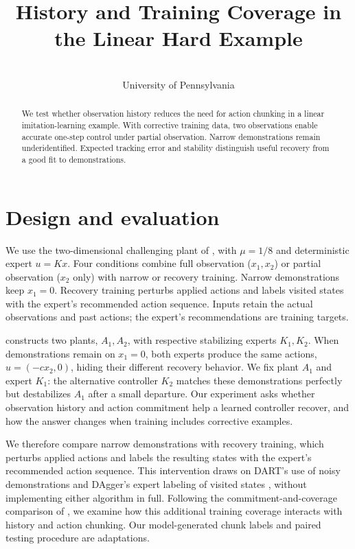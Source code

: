 \documentclass{l4dc2026}
\title[History and Training Coverage]{History and Training Coverage in the Linear Hard Example}
\author{\Name{Nihar Ballamudi}\and\Name{Kyle Horton}\\\addr University of Pennsylvania}
\begin{document}
\maketitle
\begin{abstract}
We test whether observation history reduces the need for action chunking in a linear imitation-learning example. With corrective training data, two observations enable accurate one-step control under partial observation. Narrow demonstrations remain underidentified. Expected tracking error and stability distinguish useful recovery from a good fit to demonstrations.
\end{abstract}

\section{Design and evaluation}
We use the two-dimensional challenging plant of \citet{simchowitz2025}, with $\mu=1/8$ and deterministic expert $u=Kx$. Four conditions combine full observation ($x_1,x_2$) or partial observation ($x_2$ only) with narrow or recovery training. Narrow demonstrations keep $x_1=0$. Recovery training perturbs applied actions and labels visited states with the expert's recommended action sequence. Inputs retain the actual observations and past actions; the expert's recommendations are training targets.

\citet{simchowitz2025} constructs two plants, $A_1,A_2$, with respective stabilizing experts $K_1,K_2$. When demonstrations remain on $x_1=0$, both experts produce the same actions, $u=(-cx_2,0)$, hiding their different recovery behavior. We fix plant $A_1$ and expert $K_1$: the alternative controller $K_2$ matches these demonstrations perfectly but destabilizes $A_1$ after a small departure. Our experiment asks whether observation history and action commitment help a learned controller recover, and how the answer changes when training includes corrective examples.

We therefore compare narrow demonstrations with recovery training, which perturbs applied actions and labels the resulting states with the expert's recommended action sequence. This intervention draws on DART's use of noisy demonstrations \citep{laskey2017} and DAgger's expert labeling of visited states \citep{ross2011}, without implementing either algorithm in full. Following the commitment-and-coverage comparison of \citet{zhang2025}, we examine how this additional training coverage interacts with history and action chunking. Our model-generated chunk labels and paired testing procedure are adaptations.
\end{document}
